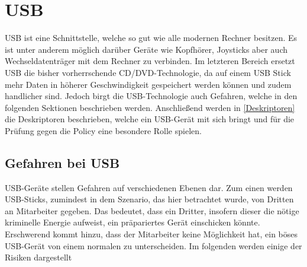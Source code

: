 \chapter{USB}
USB ist eine Schnittstelle, welche so gut wie alle modernen Rechner besitzen. Es ist unter anderem möglich darüber Geräte wie Kopfhörer, Joysticks aber auch Wechseldatenträger mit dem Rechner zu verbinden. Im letzteren Bereich ersetzt USB die bisher vorherrschende CD/DVD-Technologie, da auf einem USB Stick mehr Daten in höherer Geschwindigkeit gespeichert werden können und zudem handlicher sind. Jedoch birgt die USB-Technologie auch Gefahren, welche in den folgenden Sektionen beschrieben werden. Anschließend werden in \ref{Deskriptoren} die Deskriptoren beschrieben, welche ein USB-Gerät mit sich bringt und für die Prüfung gegen die Policy eine besondere Rolle spielen.

\section{Gefahren bei USB}\label{GefBeiUSB}
USB-Geräte stellen Gefahren auf verschiedenen Ebenen dar. Zum einen werden USB-Sticks, zumindest in dem Szenario, das hier betrachtet wurde, von Dritten an Mitarbeiter gegeben. Das bedeutet, dass ein Dritter, insofern dieser die nötige kriminelle Energie aufweist, ein präpariertes Gerät einschicken könnte. Erschwerend kommt hinzu, dass der Mitarbeiter keine Möglichkeit hat, ein böses USB-Gerät von einem normalen zu unterscheiden. Im folgenden werden einige der Risiken dargestellt

